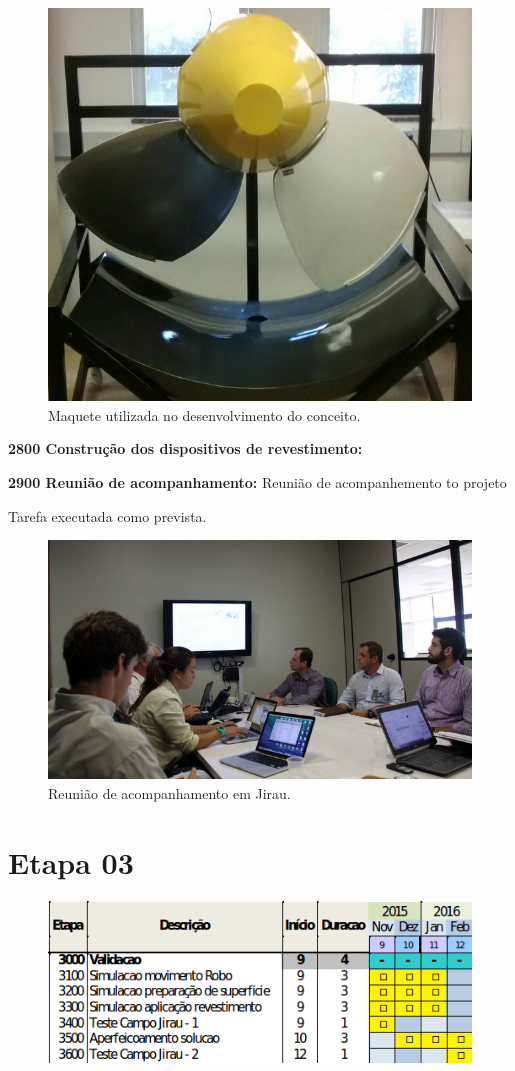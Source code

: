 \begin{figure}[h!]
\centering
\includegraphics[width=0.6\columnwidth]{figs/maquete}
\caption{Maquete utilizada no desenvolvimento do conceito.}
\end{figure} 

  

\textbf{2800 Construção dos dispositivos de revestimento:} %

\textbf{2900 Reunião de acompanhamento:} Reunião de acompanhemento to projeto

Tarefa executada como prevista. 

\begin{figure}\centering
\includegraphics[width=0.6\columnwidth]{figs/img_4836}
\caption{Reunião de acompanhamento em Jirau.}
\end{figure} 

\section{Etapa 03} 

\begin{figure}[H]
\centering
\includegraphics[width=0.9\columnwidth]{figs/etapa3}
\end{figure} 

